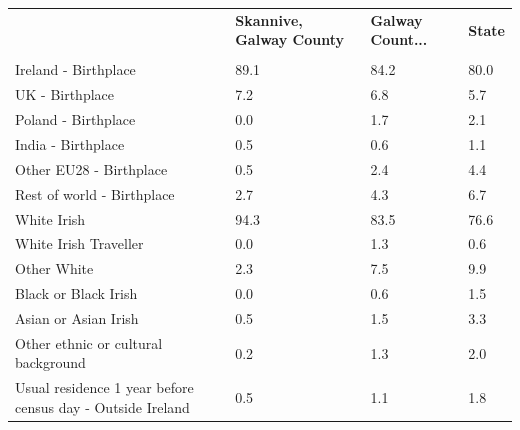 \documentclass{article}
\begin{document}
\pagebreak
\begin{table}[h]	
\centering
		\begin{tabular}{KTTT}
  \hline
& \textbf{Skannive, Galway County} & \textbf{Galway Count...} & \textbf{State}\\ 
  \hline
    \\ 
    \hline
Ireland - Birthplace & 89.1& 84.2& 80.0\\
UK - Birthplace & 7.2& 6.8& 5.7\\
Poland - Birthplace & 0.0& 1.7& 2.1\\
India - Birthplace & 0.5& 0.6& 1.1\\
Other EU28 - Birthplace & 0.5& 2.4& 4.4\\
Rest of world - Birthplace & 2.7& 4.3& 6.7\\
    \hline
White Irish & 94.3& 83.5& 76.6\\
White Irish Traveller & 0.0& 1.3& 0.6\\
Other White & 2.3& 7.5& 9.9\\
Black or Black Irish & 0.0& 0.6& 1.5\\
Asian or Asian Irish & 0.5& 1.5& 3.3\\
Other ethnic or cultural background & 0.2& 1.3& 2.0\\
    \hline
Usual residence 1 year before census day - Outside Ireland & 0.5& 1.1& 1.8\\


\end{tabular}
\end{table}
\end{document}
